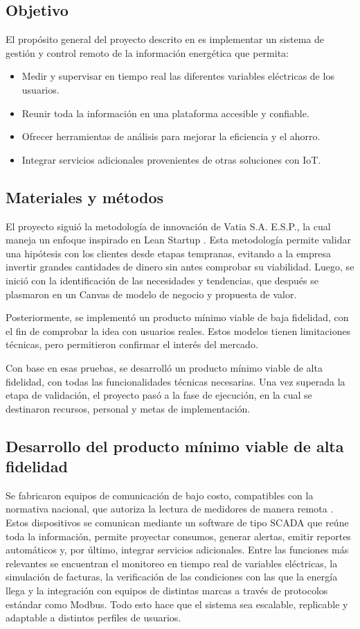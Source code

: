 \subsection{Objetivo}
El propósito general del proyecto descrito en \cite{Jaramillo2022} es implementar un sistema de gestión y control remoto de la información energética que permita:
\begin{itemize}
    \item Medir y supervisar en tiempo real las diferentes variables eléctricas de los usuarios.
    \item Reunir toda la información en una plataforma accesible y confiable.
    \item Ofrecer herramientas de análisis para mejorar la eficiencia y el ahorro.
    \item Integrar servicios adicionales provenientes de otras soluciones con IoT.
\end{itemize}

\subsection{Materiales y métodos}
El proyecto siguió la metodología de innovación de Vatia S.A. E.S.P., la cual maneja un enfoque inspirado en Lean Startup \cite{Jaramillo2022}. Esta metodología permite validar una hipótesis con los clientes desde etapas tempranas, evitando a la empresa invertir grandes cantidades de dinero sin antes comprobar su viabilidad. Luego, se inició con la identificación de las necesidades y tendencias, que después se plasmaron en un Canvas de modelo de negocio y propuesta de valor.

Posteriormente, se implementó un producto mínimo viable de baja fidelidad, con el fin de comprobar la idea con usuarios reales. Estos modelos tienen limitaciones técnicas, pero permitieron confirmar el interés del mercado.

Con base en esas pruebas, se desarrolló un producto mínimo viable de alta fidelidad, con todas las funcionalidades técnicas necesarias. Una vez superada la etapa de validación, el proyecto pasó a la fase de ejecución, en la cual se destinaron recursos, personal y metas de implementación.

\subsection{Desarrollo del producto mínimo viable de alta fidelidad}
Se fabricaron equipos de comunicación de bajo costo, compatibles con la normativa nacional, que autoriza la lectura de medidores de manera remota \cite{Jaramillo2022}. Estos dispositivos se comunican mediante un software de tipo SCADA que reúne toda la información, permite proyectar consumos, generar alertas, emitir reportes automáticos y, por último, integrar servicios adicionales. Entre las funciones más relevantes se encuentran el monitoreo en tiempo real de variables eléctricas, la simulación de facturas, la verificación de las condiciones con las que la energía llega y la integración con equipos de distintas marcas a través de protocolos estándar como Modbus. Todo esto hace que el sistema sea escalable, replicable y adaptable a distintos perfiles de usuarios.

